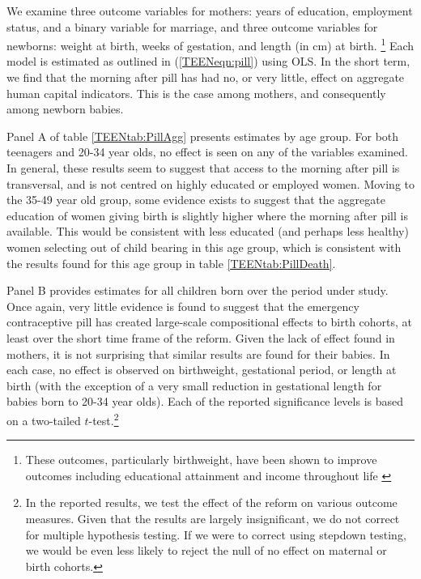 We examine three outcome variables for mothers: years of education, employment 
status, and a binary variable for marriage, and three outcome variables for 
newborns: weight at birth, weeks of gestation, and length (in cm) at birth.%
\footnote{These outcomes, particularly birthweight, have been shown to improve 
outcomes including educational attainment and income throughout life 
\citep{BehrmanRosenzweig2004}}  Each model is estimated as outlined in 
(\ref{TEENeqn:pill}) using OLS.  In the short term, we find that the morning 
after pill has had no, or very little, effect on aggregate human capital 
indicators. This is the case among mothers, and consequently among newborn 
babies.

Panel A of table \ref{TEENtab:PillAgg} presents estimates by age group.  For
both teenagers and 20-34 year olds, no effect is seen on any of the variables
examined. In general, these results seem to suggest that access to the morning 
after pill is transversal, and is not centred on highly educated or employed 
women.  Moving to the 35-49 year old group, some evidence exists to suggest
that the aggregate education of women giving birth is slightly higher where
the morning after pill is available.  This would be consistent with less
educated (and perhaps less healthy) women selecting out of child bearing in
this age group, which is consistent with the results found for this age group
in table \ref{TEENtab:PillDeath}.

Panel B provides estimates for all children born over the period under study.
Once again, very little evidence is found to suggest that the emergency 
contraceptive pill has created large-scale compositional effects to birth
cohorts, at least over the short time frame of the reform.  Given the lack of 
effect found in mothers, it is not surprising that similar results are found 
for their babies.  In each case, no effect is observed on birthweight, 
gestational period, or length at birth (with the exception of a very small 
reduction in gestational length for babies born to 20-34 year olds).  Each of 
the reported significance levels is based on a two-tailed $t$-test.\footnote{In
the reported results, we test the effect of the reform on various outcome 
measures.  Given that the results are largely insignificant, we do not correct 
for multiple hypothesis testing.  If we were to correct using stepdown testing,
we would be even less likely to reject the null of no effect on maternal or
birth cohorts.}  


